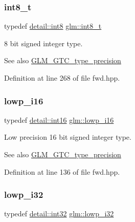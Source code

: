 \subsubsection{\texorpdfstring{int8\_t}{int8\_t}}
{\footnotesize\ttfamily typedef \mbox{\hyperlink{namespaceglm_1_1detail_a04b526a8d7a9b455602a0afa78c531e0}{detail\+::int8}} \mbox{\hyperlink{group__gtc__type__precision_ga673898d450b2a91186f3c4f40c5f8633}{glm\+::int8\+\_\+t}}}

8 bit signed integer type. \begin{DoxySeeAlso}{See also}
\mbox{\hyperlink{group__gtc__type__precision}{G\+L\+M\+\_\+\+G\+T\+C\+\_\+type\+\_\+precision}} 
\end{DoxySeeAlso}


Definition at line 268 of file fwd.\+hpp.

\mbox{\label{group__gtc__type__precision_gaf7bbfd31bcec25a416ea94d09efb5451}} 
\subsubsection{\texorpdfstring{lowp\_i16}{lowp\_i16}}
{\footnotesize\ttfamily typedef \mbox{\hyperlink{namespaceglm_1_1detail_a375938874ca4f0a0982ec6373b56117b}{detail\+::int16}} \mbox{\hyperlink{group__gtc__type__precision_gaf7bbfd31bcec25a416ea94d09efb5451}{glm\+::lowp\+\_\+i16}}}

Low precision 16 bit signed integer type. \begin{DoxySeeAlso}{See also}
\mbox{\hyperlink{group__gtc__type__precision}{G\+L\+M\+\_\+\+G\+T\+C\+\_\+type\+\_\+precision}} 
\end{DoxySeeAlso}


Definition at line 136 of file fwd.\+hpp.

\mbox{\label{group__gtc__type__precision_ga70fd34e8b8cffc92739161284ed77328}} 
\subsubsection{\texorpdfstring{lowp\_i32}{lowp\_i32}}
{\footnotesize\ttfamily typedef \mbox{\hyperlink{namespaceglm_1_1detail_a9f85b4efeca416cdcec2fd08939a2e17}{detail\+::int32}} \mbox{\hyperlink{group__gtc__type__precision_ga70fd34e8b8cffc92739161284ed77328}{glm\+::lowp\+\_\+i32}}}


